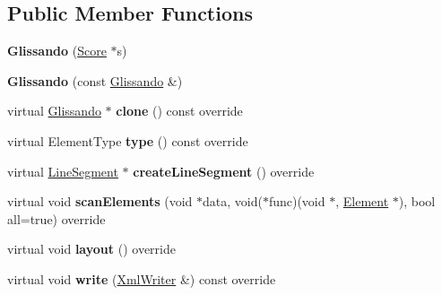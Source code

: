\subsection*{Public Member Functions}
\begin{DoxyCompactItemize}
\item 
\mbox{\label{class_ms_1_1_glissando_a035647d7917e15ae1c4b02b74e64a51f}} 
{\bfseries Glissando} (\hyperlink{class_ms_1_1_score}{Score} $\ast$s)
\item 
\mbox{\label{class_ms_1_1_glissando_a3367939aac840a18e21a390cd46b6ae3}} 
{\bfseries Glissando} (const \hyperlink{class_ms_1_1_glissando}{Glissando} \&)
\item 
\mbox{\label{class_ms_1_1_glissando_a59ee702d4a5c08af9f116dc69d2346d6}} 
virtual \hyperlink{class_ms_1_1_glissando}{Glissando} $\ast$ {\bfseries clone} () const override
\item 
\mbox{\label{class_ms_1_1_glissando_abb59a1e6ea3a9a40abea376d34914d7e}} 
virtual Element\+Type {\bfseries type} () const override
\item 
\mbox{\label{class_ms_1_1_glissando_a2757f45ffc5568e9b29a863aca004210}} 
virtual \hyperlink{class_ms_1_1_line_segment}{Line\+Segment} $\ast$ {\bfseries create\+Line\+Segment} () override
\item 
\mbox{\label{class_ms_1_1_glissando_ace0b9c6c42b525a939517e052496adb6}} 
virtual void {\bfseries scan\+Elements} (void $\ast$data, void($\ast$func)(void $\ast$, \hyperlink{class_ms_1_1_element}{Element} $\ast$), bool all=true) override
\item 
\mbox{\label{class_ms_1_1_glissando_a4ae390f3b6495ea74eb9f1d6b781c939}} 
virtual void {\bfseries layout} () override
\item 
\mbox{\label{class_ms_1_1_glissando_af3bc8fb84dd292a9b1e7b5fb9f9729d5}} 
virtual void {\bfseries write} (\hyperlink{class_ms_1_1_xml_writer}{Xml\+Writer} \&) const override
\item 
\mbox{\label{class_ms_1_1_glissando_a8fbe450533f4fd028d56b501be54b2b2}} 

\end{DoxyCompactItemize}
